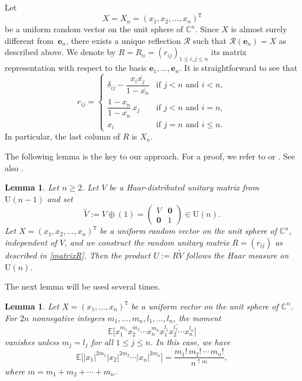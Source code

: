 \documentclass[10pt,a4paper]{amsart}
\numberwithin{equation}{section}
\newtheorem{Lemma}[Theorem]{Lemma}
\theoremstyle{definition}
\newcommand{\UU}{\mathrm{U}}
\newcommand{\trans}[1]{#1^{\mathtt{T}}}
\newcommand{\Refl}{\mathcal{R}}
\begin{document}
Let
\[
X=X_n =\trans{(x_1,x_2,\dots,x_n)}
\]
be a uniform random vector on the unit sphere of $\mathbb{C}^n$.
Since $X$ is almost surely different from~$\bm{e}_n$,
 there exists a unique reflection $\Refl$ such that
$\Refl(\bm{e}_n)=X$ as described above.
We denote by $R=R_n=(r_{ij})_{1 \le i,j \le n}$ its matrix representation with respect to the basis $\bm{e}_1,\dots, \bm{e}_n$.
It is straightforward to see that
\begin{equation} \label{matrixR}
r_{ij}= \begin{cases}
\delta_{ij}-\dfrac{x_{i}\overline{x_{j}}}{1-\overline{x_{n}}} &\text{if $j<n$ and $i <n$}, \\
\dfrac{1-x_{n}}{1-\overline{x_{n}}}\, \overline{x_{j}} &\text{if $j<n$ and $i=n$},\\
x_{i} & \text{if $j=n$ and $i \le n$}.
\end{cases}
\end{equation}
In particular, the last column of $R$ is $X_n$.

The following lemma is the key to our approach. For a proof, we refer to \cite[Proposition 3.1]{BNN} or \cite[Theorem 1]{BNR}.
See also \cite[Proposition 2.1]{BHNY}.

\begin{Lemma}
\label{lem:BNN}
Let $n \ge 2$. Let $V$ be a Haar-distributed unitary matrix from $\UU (n-1)$ and set
\begin{equation*} %
\tilde{V}:= V \oplus (1)=\begin{pmatrix} V & \bm{0} \\ \bm{0} & 1 \end {pmatrix} \in \UU(n).
\end{equation*}
Let $X=\trans{(x_1,x_2,\dots,x_n)}$ be a uniform random vector on the unit sphere of $\mathbb{C}^n$, independent of $V$,
and we construct the random unitary matrix $R=(r_{ij})$ as described in \eqref{matrixR}.
Then the product $U:=R \tilde{V}$ follows the Haar measure on $\UU (n)$.
\end{Lemma}


The next lemma will be used several times.

\begin{Lemma} \label{lem:Wg_for_R}
Let $X=\trans{(x_1,\dots,x_n)}$ be a uniform vector on the unit sphere of $\mathbb{C}^n$.
For $2n$ nonnegative integers $m_1,\dots, m_n, l_1,\dots, l_n$, the moment
\[
\mathbb{E}\bigl[x_1^{m_1} x_2^{m_2} \cdots x_n^{m_n} \overline{x_1^{l_1} x_2^{l_2} \cdots x_n^{l_n}} \bigr]
\]
 vanishes unless $m_j=l_j$ for all $1 \le j \le n$.
In this case, we have
\[
\mathbb{E} \bigl[|x_1|^{2m_1} |x_2|^{2m_2} \cdots |x_n|^{2m_n}\bigr]
= \frac{m_1! \, m_2! \, \cdots \, m_n!}{n^{\uparrow m}},
\]
where $m=m_1+ m_2+ \cdots+m_n$.
\end{Lemma}
\end{document}
